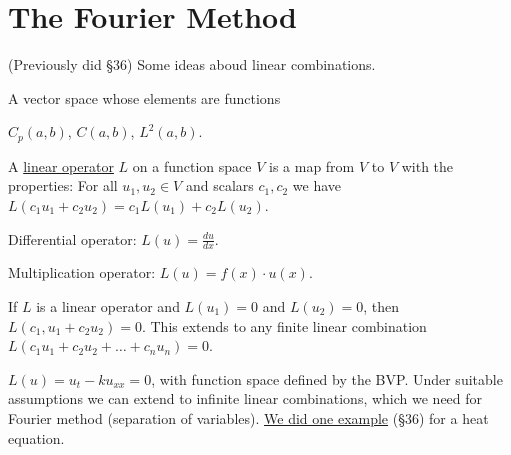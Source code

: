 \documentclass[]{article}
\begin{document}
\section{The Fourier Method}
(Previously did \S36) 
Some ideas aboud linear combinations.
\begin{definition}
	 A vector space whose elements are functions
\end{definition}
\begin{example}
	$C_p(a,b)$, $C(a,b)$, $L^2(a,b)$.
\end{example}
\begin{definition}
	 A \underline{linear operator} $L$ on a function space $V$ is a map from $V$ to $V$ with the properties:
	For all $u_1,u_2\in V$ and scalars $c_1,c_2$ we have $L(c_1u_1+c_2u_2) = c_1L(u_1)+c_2L(u_2)$.
\end{definition}
\begin{example}
	Differential operator: $L(u) = \frac{du}{dx}$.
\end{example}
\begin{example}
	Multiplication operator: $L(u) = f(x)\cdot u(x)$.
\end{example}
\begin{definition}
	 If $L$ is a linear operator and $L(u_1)=0$ and $L(u_2) = 0$, then $L(c_1,u_1+c_2u_2) =0$. This extends to any finite linear combination $L(c_1u_1+c_2u_2+\dots+c_nu_n) = 0$.
\end{definition}
\begin{example}
	$L(u)=u_t-ku_{xx}=0$, with function space defined  by the BVP.
	Under suitable assumptions we can extend to infinite linear combinations, which we need for Fourier method (separation of variables).
	\underline{We did one example} (\S 36) for a heat equation.
\end{example}
\end{document}
